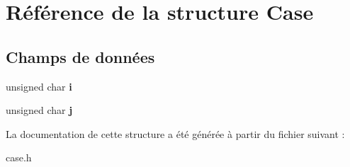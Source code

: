 \hypertarget{structCase}{\section{Référence de la structure Case}
\label{structCase}
}
\subsection*{Champs de données}
\begin{DoxyCompactItemize}
\item 
\hypertarget{structCase_aa153db46def2bd44f5e438a0f5695779}{unsigned char {\bfseries i}}\label{structCase_aa153db46def2bd44f5e438a0f5695779}

\item 
\hypertarget{structCase_aa29567a6d5b6753ecf7cff4567a77e1e}{unsigned char {\bfseries j}}\label{structCase_aa29567a6d5b6753ecf7cff4567a77e1e}

\end{DoxyCompactItemize}


La documentation de cette structure a été générée à partir du fichier suivant \-:\begin{DoxyCompactItemize}
\item 
case.\-h\end{DoxyCompactItemize}
